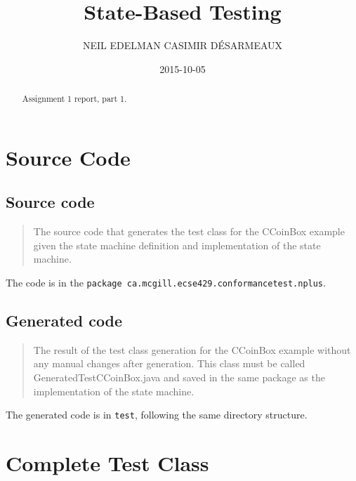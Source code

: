 \documentclass[ieee]{submit}
\title{State-Based Testing}
\date{2015-10-05}
\author{
	\MakeUppercase{Neil Edelman}
	\affil{McGill University (110121860)}
	\MakeUppercase{Casimir D\'esarmeaux}
	\affil{McGill University}
}
\begin{document}

\begin{abstract}
Assignment 1 report, part 1.
\end{abstract}

\maketitle


\clearpage
{}

\tableofcontents



\clearpage
{}

\section{Source Code}

\subsection{Source code}

\begin{quote}
The source code that generates the test class for the CCoinBox example given the state
machine definition and implementation of the state machine.
\end{quote}

The code is in the {\tt package ca.mcgill.ecse429.conformancetest.nplus}.

\subsection{Generated code}

\begin{quote}
The result of the test class generation for the CCoinBox example without any manual changes
after generation. This class must be called GeneratedTestCCoinBox.java and saved in the same package as the implementation of the state machine.
\end{quote}

The generated code is in {\tt test}, following the same directory structure.

\section{Complete Test Class}
\end{document}
